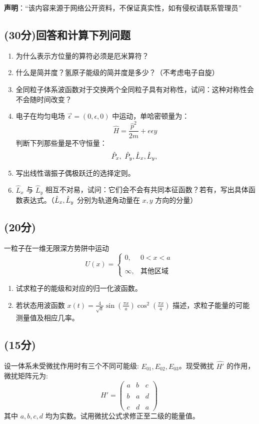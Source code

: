 
\textbf{声明}：“该内容来源于网络公开资料，不保证真实性，如有侵权请联系管理员”

\subsection{(30分)回答和计算下列问题}
\begin{enumerate}
    \item 为什么表示方位量的算符必须是厄米算符？
    \item 什么是简并度？氢原子能级的简并度是多少？（不考虑电子自旋）
    \item 全同粒子体系波函数对于交换两个全同粒子具有对称性，试问：这种对称性会不会随时间改变？
    \item 电子在均匀电场 $\vec{\epsilon}=(0, \epsilon, 0)$ 中运动，单哈密顿量为：
      \[      \hat{H} = \frac{\hat{p}^2}{2m} + e\epsilon y ~\]
      判断下列那些量是不守恒量：
      \[      \hat{P}_x,\ \hat{P}_y,\\  \hat{L}_x,\\ \hat{L}_y,\\  ~\]
    \item 写出线性谐振子偶极跃迁的选择定则。
    \item $\hat{L}_x$ 与 $\hat{L}_y$ 相互不对易，试问：它们会不会有共同本征函数？若有，写出具体函数表达式。（$\hat{L}_x,\\ \hat{L}_y$ 分别为轨道角动量在 $x, y$ 方向的分量）
  \end{enumerate}
  
\subsection{(20分)}
一粒子在一维无限深方势阱中运动
  \[  U(x) =  \begin{cases}    0, & 0 < x < a \\\\    \infty, & \text{其他区域}  \end{cases} ~\]
  \begin{enumerate}
    \item 试求粒子的能级和对应的归一化波函数。
    \item 若状态用波函数 $x(t) = \frac{4}{\sqrt{a}} \sin\left( \frac{\pi x}{a} \right) \cos^2\left( \frac{\pi x}{a} \right)$ 描述，求粒子能量的可能测量值及相应几率。
  \end{enumerate}
\subsection{(15分)}
设一体系未受微扰作用时有三个不同可能级: $E_{01}, E_{02}, E_{03}$。现受微扰 $\hat{H'}$ 的作用，微扰矩阵元为:
\[\hat{H'} = \begin{pmatrix}a & b & c \\\\b & a & d \\\\c & d & a\end{pmatrix}~\]
其中 $a, b, c, d$ 均为实数。试用微扰公式求修正至二级的能量值。
